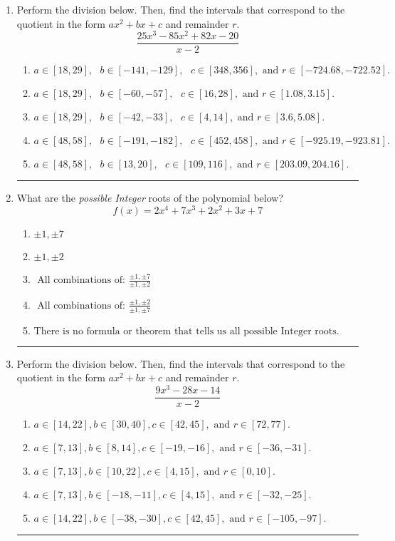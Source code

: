 \documentclass[14pt]{extbook}
\newcommand{\litem}[1]{\item#1\hspace*{-1cm}\rule{\textwidth}{0.4pt}}
\begin{document}
\begin{enumerate}
\litem{
Perform the division below. Then, find the intervals that correspond to the quotient in the form $ax^2+bx+c$ and remainder $r$.\[ \frac{25x^{3} -85 x^{2} +82 x -20}{x -2} \]\begin{enumerate}[label=\Alph*.]
\item \( a \in [18, 29], \text{   } b \in [-141, -129], \text{   } c \in [348, 356], \text{   and   } r \in [-724.68, -722.52]. \)
\item \( a \in [18, 29], \text{   } b \in [-60, -57], \text{   } c \in [16, 28], \text{   and   } r \in [1.08, 3.15]. \)
\item \( a \in [18, 29], \text{   } b \in [-42, -33], \text{   } c \in [4, 14], \text{   and   } r \in [3.6, 5.08]. \)
\item \( a \in [48, 58], \text{   } b \in [-191, -182], \text{   } c \in [452, 458], \text{   and   } r \in [-925.19, -923.81]. \)
\item \( a \in [48, 58], \text{   } b \in [13, 20], \text{   } c \in [109, 116], \text{   and   } r \in [203.09, 204.16]. \)

\end{enumerate} }
\litem{
What are the \textit{possible Integer} roots of the polynomial below?\[ f(x) = 2x^{4} +7 x^{3} +2 x^{2} +3 x + 7 \]\begin{enumerate}[label=\Alph*.]
\item \( \pm 1,\pm 7 \)
\item \( \pm 1,\pm 2 \)
\item \( \text{ All combinations of: }\frac{\pm 1,\pm 7}{\pm 1,\pm 2} \)
\item \( \text{ All combinations of: }\frac{\pm 1,\pm 2}{\pm 1,\pm 7} \)
\item \( \text{There is no formula or theorem that tells us all possible Integer roots.} \)

\end{enumerate} }
\litem{
Perform the division below. Then, find the intervals that correspond to the quotient in the form $ax^2+bx+c$ and remainder $r$.\[ \frac{9x^{3} -28 x -14}{x -2} \]\begin{enumerate}[label=\Alph*.]
\item \( a \in [14, 22], b \in [30, 40], c \in [42, 45], \text{ and } r \in [72, 77]. \)
\item \( a \in [7, 13], b \in [8, 14], c \in [-19, -16], \text{ and } r \in [-36, -31]. \)
\item \( a \in [7, 13], b \in [10, 22], c \in [4, 15], \text{ and } r \in [0, 10]. \)
\item \( a \in [7, 13], b \in [-18, -11], c \in [4, 15], \text{ and } r \in [-32, -25]. \)
\item \( a \in [14, 22], b \in [-38, -30], c \in [42, 45], \text{ and } r \in [-105, -97]. \)


\end{enumerate}}
\end{enumerate}
\end{document}

